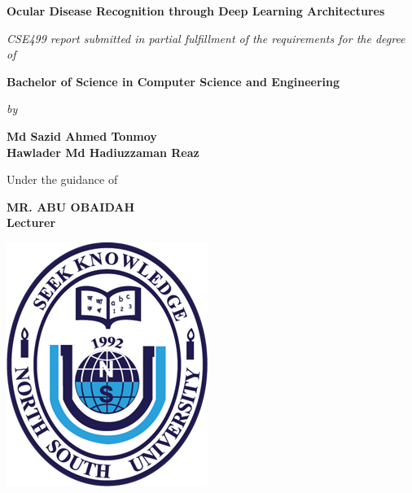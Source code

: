 \begin{titlepage}
\begin{center}

{\selectfont
\huge \bfseries Ocular Disease Recognition through Deep Learning Architectures}\\
\vspace*{1cm}

{\large  \itshape CSE499 report submitted in partial fulfillment of the requirements for the degree}\\
\vspace*{0.5cm}
{\large \itshape {of}}\\
\vspace*{0.5cm}

{\selectfont
\huge \bfseries Bachelor of Science in Computer Science and Engineering}\\
\vspace*{0.5cm}

{\large \itshape {by}}\\
\vspace*{0.5cm}
\begin{center}

{\bfseries Md Sazid Ahmed Tonmoy }\hspace{2cm}{ \bfseries ID: 1911498042}\\
{ \bfseries Hawlader Md Hadiuzzaman Reaz }\hspace{0.5cm}{ \bfseries ID: 1821940042}\\
\par\end{center}
\vspace*{0.5cm}

{\large Under the guidance of\\}
\vspace*{0.2cm}

{\Large \bfseries MR. ABU OBAIDAH\\}
{\Large \bfseries Lecturer\\}

\vspace*{1.0cm}

\includegraphics[scale=0.6]{nsu.png}
\vspace*{0.5cm}


\end{center}
\end{titlepage}

